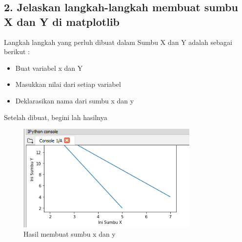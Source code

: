 \subsection{2. Jelaskan langkah-langkah membuat sumbu X dan Y di matplotlib}
Langkah langkah yang perluh dibuat dalam Sumbu X dan Y adalah sebagai berikut :
\begin{itemize}
\item Buat variabel x dan Y
\item Masukkan nilai dari setiap variabel

\item Deklarasikan nama dari sumbu x dan y 

\end{itemize}

Setelah dibuat, begini lah hasilnya
\begin{figure}[H]
\includegraphics[width=9cm]{figures/6/Teori/1174005/1.png}
\caption{Hasil membuat sumbu x dan y}
\centering
\end{figure}

